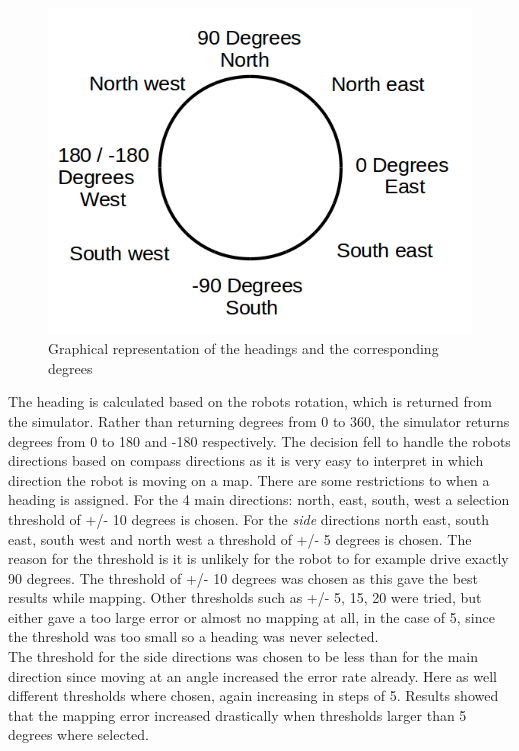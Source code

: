 \begin{figure}[h]
\centering
\includegraphics[scale=0.5]{Chapter3/images/heading.png}
\caption{Graphical representation of the headings and the corresponding degrees}
\label{fig:heading}
\end{figure}

The heading is calculated based on the robots rotation, which is returned from the simulator. 
Rather than returning degrees from 0 to 360, the simulator returns degrees from 0 to 180 and -180 respectively.
The decision fell to handle the robots directions based on compass directions as it is very easy to interpret in which direction the robot is moving on a map.
There are some restrictions to when a heading is assigned. For the 4 main directions: north, east, south, west a selection threshold of +/- 10 degrees is chosen. 
For the \textit{side} directions north east, south east, south west and north west a threshold of +/- 5 degrees is chosen. 
The reason for the threshold is it is unlikely for the robot to for example drive exactly 90 degrees. 
The threshold of +/- 10 degrees was chosen as this gave the best results while mapping. Other thresholds such as +/- 5, 15, 20 were tried, but either gave a too large error or almost no mapping at all, in the case of 5, since the threshold was too small so a heading was never selected.\\

The threshold for the side directions was chosen to be less than for the main direction since moving at an angle increased the error rate already. 
Here as well different thresholds where chosen, again increasing in steps of 5.
Results showed that the mapping error increased drastically when thresholds larger than 5 degrees where selected. \\


